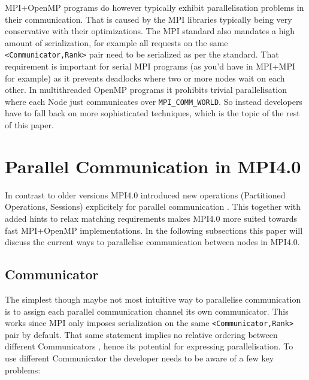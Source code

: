 \documentclass[sigconf]{acmart}
\begin{document}
MPI+OpenMP programs do however typically exhibit parallelisation problems in their communication.
That is caused by the MPI libraries typically being very conservative with their optimizations.
The MPI standard also mandates a high amount of serialization, for example all requests on the same \verb|<Communicator,Rank>| pair need to be serialized as per the standard.
That requirement is important for serial MPI programs (as you'd have in MPI+MPI for example) as it prevents deadlocks where two or more nodes wait on each other.
In multithreaded OpenMP programs it prohibits trivial parallelisation where each Node just communicates over \verb|MPI_COMM_WORLD|.
So instead developers have to fall back on more sophisticated techniques, which is the topic of the rest of this paper.

\section{Parallel Communication in MPI4.0}


In contrast to older versions MPI4.0 introduced new operations (Partitioned Operations, Sessions) explicitely for parallel communication \cite{mpi40}.
This together with added hints to relax matching requirements makes MPI4.0 more suited towards fast MPI+OpenMP implementations.
In the following subsections this paper will discuss the current ways to parallelise communication between nodes in MPI4.0.

\subsection{Communicator}

The simplest though maybe not most intuitive way to parallelise communication is to assign each parallel communication channel its own communicator.
This works since MPI only imposes serialization on the same \verb|<Communicator,Rank>| pair by default.
That same statement implies no relative ordering between different Communicators \cite{zambreLessonsLearned2022}, hence its potential for expressing parallelisation.
To use different Communicator the developer needs to be aware of a few key problems:
\end{document}

